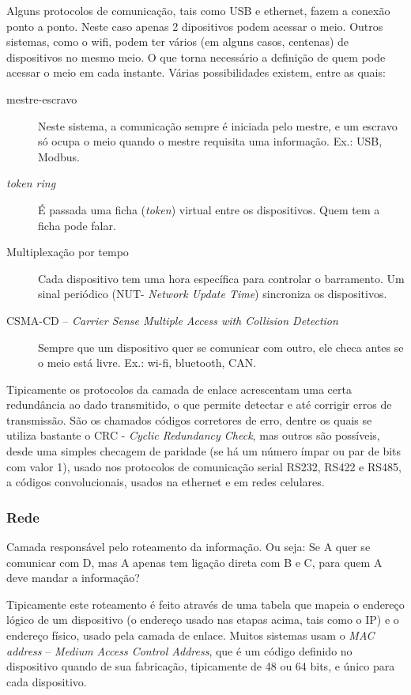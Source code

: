 Alguns protocolos de comunicação, tais como USB e ethernet, fazem a conexão ponto a ponto. Neste caso apenas 2 dipositivos podem acessar o meio. Outros sistemas, como o wifi, podem ter vários (em alguns casos, centenas) de dispositivos no mesmo meio. O que torna necessário a definição de quem pode acessar o meio em cada instante. Várias possibilidades existem, entre as quais:
\begin{description}
	\item[mestre-escravo] Neste sistema, a comunicação sempre é iniciada pelo mestre, e um escravo só ocupa o meio quando o mestre requisita uma informação. Ex.: USB, Modbus.
	\item[\emph{token ring}] É passada uma ficha (\emph{token}) virtual entre os dispositivos. Quem tem a ficha pode falar.
	\item[Multiplexação por tempo] Cada dispositivo tem uma hora específica para controlar o barramento. Um sinal periódico (NUT- \emph{Network Update Time}) sincroniza os dispositivos.
	\item[CSMA-CD -- \emph{Carrier Sense Multiple Access with Collision Detection}] Sempre que um dispositivo quer se comunicar com outro, ele checa antes se o meio está livre. Ex.: wi-fi, bluetooth, CAN.
\end{description}

Tipicamente os protocolos da camada de enlace acrescentam uma certa redundância ao dado transmitido, o que permite detectar e até corrigir erros de transmissão. São os chamados códigos corretores de erro, dentre os quais se utiliza bastante o CRC - \emph{Cyclic Redundancy Check}, mas outros são possíveis, desde uma simples checagem de paridade (se há um número ímpar ou par de bits com valor 1), usado nos protocolos de comunicação serial RS232, RS422 e RS485, a códigos convolucionais, usados na ethernet e em redes celulares.

\subsubsection{Rede}
Camada responsável pelo roteamento da informação. Ou seja: Se A quer se comunicar com D, mas A apenas tem ligação direta com B e C, para quem A deve mandar a informação?

Tipicamente este roteamento é feito através de uma tabela que mapeia o endereço lógico de um dispositivo (o endereço usado nas etapas acima, tais como o IP) e o endereço físico, usado pela camada de enlace. Muitos sistemas usam o \emph{MAC address} -- \emph{Medium Access Control Address}, que é um código definido no dispositivo quando de sua fabricação, tipicamente de 48 ou 64 bits, e único para cada dispositivo.

